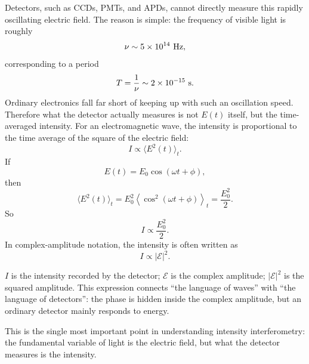 Detectors, such as CCDs, PMTs, and APDs, cannot directly measure this rapidly oscillating electric field. The reason is simple: the frequency of visible light is roughly
\[
  \nu\sim 5\times 10^{14}\ {\rm Hz},
\]
corresponding to a period
\[
  T=\frac{1}{\nu}\sim 2\times 10^{-15}\ {\rm s}.
\]
Ordinary electronics fall far short of keeping up with such an oscillation speed. Therefore what the detector actually measures is not \(E(t)\) itself, but the time-averaged intensity. For an electromagnetic wave, the intensity is proportional to the time average of the square of the electric field:
\[
  I\propto \langle E^2(t)\rangle_t.
\]
If
\[
  E(t)=E_0\cos(\omega t+\phi),
\]
then
\[
  \langle E^2(t)\rangle_t
  =
  E_0^2\left\langle \cos^2(\omega t+\phi)\right\rangle_t
  =
  \frac{E_0^2}{2}.
\]
So
\[
  I\propto \frac{E_0^2}{2}.
\]
In complex-amplitude notation, the intensity is often written as
\[
  I\propto |\mathcal E|^2.
\]
\begin{formulaexplain}
\(I\) is the intensity recorded by the detector; \(\mathcal E\) is the complex amplitude; \(|\mathcal E|^2\) is the squared amplitude. This expression connects ``the language of waves'' with ``the language of detectors'': the phase is hidden inside the complex amplitude, but an ordinary detector mainly responds to energy.
\end{formulaexplain}
This is the single most important point in understanding intensity interferometry: the fundamental variable of light is the electric field, but what the detector measures is the intensity.

